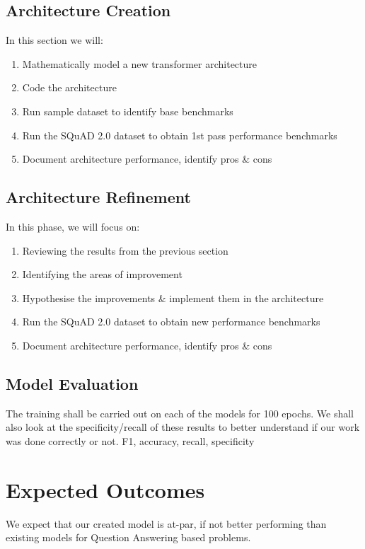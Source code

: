 \documentclass[11pt]{article}
\begin{document}
\subsection{Architecture Creation}\label{architecturecreation}
In this section we will:

\begin{enumerate}
    \item{Mathematically model a new transformer architecture}
    \item{Code the architecture}
    \item{Run sample dataset to identify base benchmarks}
    \item{Run the SQuAD 2.0 dataset\citep{dataset} to obtain 1st pass performance benchmarks}
    \item{Document architecture performance, identify pros \& cons}
\end{enumerate}
\subsection{Architecture Refinement}\label{refinement}
In this phase, we will focus on:
\begin{enumerate}
    \item{Reviewing the results from the previous section}
    \item{Identifying the areas of improvement}
    \item{Hypothesise the improvements \& implement them in the architecture}
    \item{Run the SQuAD 2.0 dataset\citep{dataset} to obtain new performance benchmarks}
    \item{Document architecture performance, identify pros \& cons}
\end{enumerate}
\subsection{Model Evaluation}
 The training shall be carried out on each of the models for 100 epochs. We shall also look at the specificity/recall of these results to better understand if our work was done correctly or not. F1, accuracy, recall, specificity
\section{Expected Outcomes}\label{expectedoutcomes}

We expect that our created model is at-par, if not better performing than existing models for Question Answering based problems.
\end{document}

